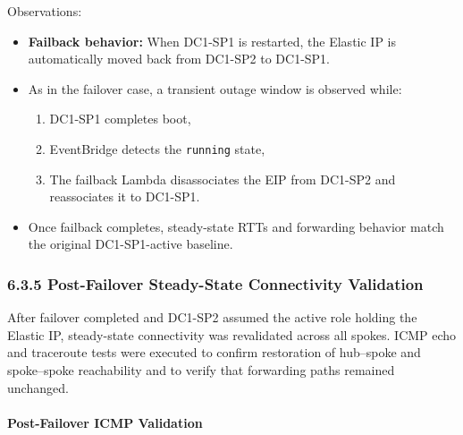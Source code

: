 \documentclass[11pt]{article}
\begin{document}
Observations:

\begin{itemize}
  \item \textbf{Failback behavior:}
        When DC1-SP1 is restarted, the Elastic IP is automatically moved back from
        DC1-SP2 to DC1-SP1.
  \item As in the failover case, a transient outage window is observed while:
        \begin{enumerate}
          \item DC1-SP1 completes boot,
          \item EventBridge detects the \texttt{running} state,
          \item The failback Lambda disassociates the EIP from DC1-SP2 and reassociates it to DC1-SP1.
        \end{enumerate}
  \item Once failback completes, steady-state RTTs and forwarding behavior match the
        original DC1-SP1-active baseline.
\end{itemize}

%
%
%
\subsubsection{6.3.5 Post-Failover Steady-State Connectivity Validation}
\label{sec:post-failover-validation}

After failover completed and DC1-SP2 assumed the active role holding the Elastic IP, steady-state connectivity was revalidated across all spokes. ICMP echo and traceroute tests were executed to confirm restoration of hub--spoke and spoke--spoke reachability and to verify that forwarding paths remained unchanged.

\paragraph{Post-Failover ICMP Validation}
\end{document}
